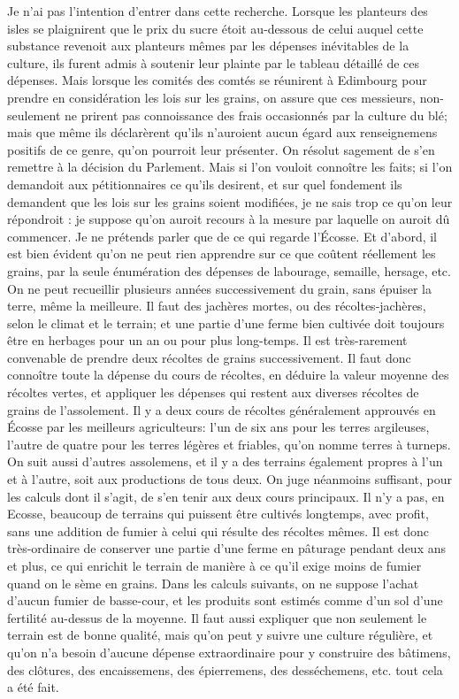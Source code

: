 Je n'ai pas l'intention d'entrer dans cette recherche. Lorsque les planteurs des isles se plaignirent que le prix du sucre étoit au-dessous de celui auquel cette substance revenoit aux planteurs mêmes par les dépenses inévitables de la culture, ils furent admis à soutenir leur plainte par le tableau détaillé de ces dépenses. Mais lorsque les comités des comtés se réunirent à Edimbourg pour prendre en considération les lois sur les grains, on assure que ces messieurs, non-seulement ne prirent pas connoissance des frais occasionnés par la culture du blé; mais que même ils déclarèrent qu'ils n'auroient aucun égard aux renseignemens positifs de ce genre, qu'on pourroit leur présenter. On résolut sagement de s'en remettre à la décision du Parlement. Mais si l'on vouloit connoître les faits; si l'on demandoit aux pétitionnaires ce qu'ils desirent, et sur quel fondement ils demandent que les lois sur les grains soient modifiées, je ne sais trop ce qu'on leur répondroit : je suppose\setcounter{page}{304} qu'on auroit recours à la mesure par laquelle on auroit dû commencer.
Je ne prétends parler que de ce qui regarde l'Écosse. Et d'abord, il est bien évident qu'on ne peut rien apprendre sur ce que coûtent réellement les grains, par la seule énumération des dépenses de labourage, semaille, hersage, etc. On ne peut recueillir plusieurs années successivement du grain, sans épuiser la terre, même la meilleure. Il faut des jachères mortes, ou des récoltes-jachères, selon le climat et le terrain; et une partie d'une ferme bien cultivée doit toujours être en herbages pour un an ou pour plus long-temps. Il est très-rarement convenable de prendre deux récoltes de grains successivement. Il faut donc connoître toute la dépense du cours de récoltes, en déduire la valeur moyenne des récoltes vertes, et appliquer les dépenses qui restent aux diverses récoltes de grains de l'assolement.
Il y a deux cours de récoltes généralement approuvés en Écosse par les meilleurs agriculteurs: l'un de six ans pour les terres argileuses, l'autre de quatre pour les terres légères et friables, qu'on nomme terres à turneps. On suit aussi d'autres assolemens, et il y a des terrains également propres à l'un et à l'autre, soit aux productions de\setcounter{page}{305} tous deux. On juge néanmoins suffisant, pour les calculs dont il s'agit, de s'en tenir aux deux cours principaux.
Il n'y a pas, en Ecosse, beaucoup de terrains qui puissent être cultivés longtemps, avec profit, sans une addition de fumier à celui qui résulte des récoltes mêmes. Il est donc très-ordinaire de conserver une partie d'une ferme en pâturage pendant deux ans et plus, ce qui enrichit le terrain de manière à ce qu'il exige moins de fumier quand on le sème en grains. Dans les calculs suivants, on ne suppose l'achat d'aucun fumier de basse-cour, et les produits sont estimés comme d'un sol d'une fertilité au-dessus de la moyenne. Il faut aussi expliquer que non seulement le terrain est de bonne qualité, mais qu'on peut y suivre une culture régulière, et qu'on n'a besoin d'aucune dépense extraordinaire pour y construire des bâtimens, des clôtures, des encaissemens, des épierremens, des desséchemens, etc. tout cela a été fait.
